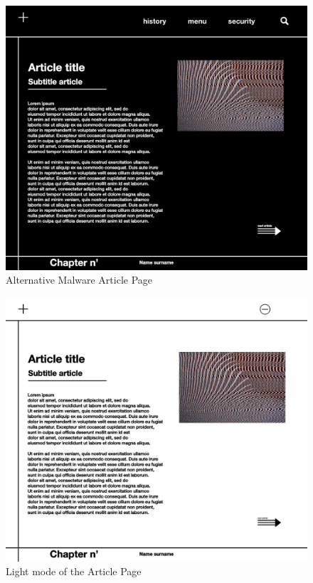 \documentclass[a4paper,10pt]{article}
\begin{document}
\begin{figure}[p]
\includegraphics[height=0.52\paperheight, center]{alternative_malware_page.jpeg}
\caption{Alternative Malware Article Page}
\end{figure}

\begin{figure}[p]
\includegraphics[height=0.52\paperheight, center]{lightmode_articletitle.jpeg}
\caption{Light mode of the Article Page}
\end{figure}
\end{document}
